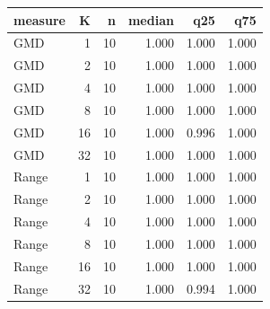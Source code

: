 \begin{tabular}{lrrrrr}
\toprule
measure & K & n & median & q25 & q75 \\
\midrule
GMD & 1 & 10 & 1.000 & 1.000 & 1.000 \\
GMD & 2 & 10 & 1.000 & 1.000 & 1.000 \\
GMD & 4 & 10 & 1.000 & 1.000 & 1.000 \\
GMD & 8 & 10 & 1.000 & 1.000 & 1.000 \\
GMD & 16 & 10 & 1.000 & 0.996 & 1.000 \\
GMD & 32 & 10 & 1.000 & 1.000 & 1.000 \\
Range & 1 & 10 & 1.000 & 1.000 & 1.000 \\
Range & 2 & 10 & 1.000 & 1.000 & 1.000 \\
Range & 4 & 10 & 1.000 & 1.000 & 1.000 \\
Range & 8 & 10 & 1.000 & 1.000 & 1.000 \\
Range & 16 & 10 & 1.000 & 1.000 & 1.000 \\
Range & 32 & 10 & 1.000 & 0.994 & 1.000 \\
\bottomrule
\end{tabular}

